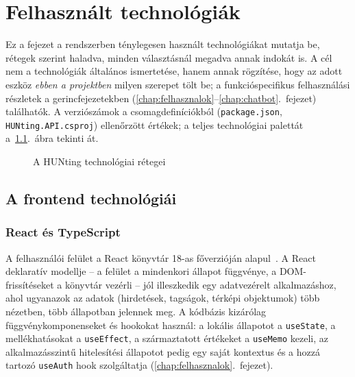
\chapter{Felhasznált technológiák}
\label{chap:technologiak}

Ez a fejezet a rendszerben ténylegesen használt technológiákat mutatja be, rétegek szerint
haladva, minden választásnál megadva annak indokát is. A cél nem a technológiák általános
ismertetése, hanem annak rögzítése, hogy az adott eszköz \emph{ebben a projektben} milyen
szerepet tölt be; a funkcióspecifikus felhasználási részletek a gerincfejezetekben
(\ref{chap:felhasznalok}--\ref{chap:chatbot}.~fejezet) találhatók. A verziószámok a
csomagdefiníciókból (\texttt{package.json}, \texttt{HUNting.API.csproj}) ellenőrzött értékek;
a teljes technológiai palettát a~\ref{fig:stack}.~ábra tekinti át.

\begin{figure}[htbp]
	\centering
	\caption{A HUNting technológiai rétegei}
	\label{fig:stack}
\end{figure}

\section{A frontend technológiái}
\label{sec:tech-frontend}

\subsection{React és TypeScript}

A felhasználói felület a React könyvtár 18-as főverzióján alapul~\cite{reactdocs}. A React
deklaratív modellje -- a felület a mindenkori állapot függvénye, a DOM-frissítéseket a könyvtár
vezérli -- jól illeszkedik egy adatvezérelt alkalmazáshoz, ahol ugyanazok az adatok (hirdetések,
tagságok, térképi objektumok) több nézetben, több állapotban jelennek meg. A kódbázis kizárólag
függvénykomponenseket és hookokat használ: a lokális állapotot a \texttt{useState}, a
mellékhatásokat a \texttt{useEffect}, a származtatott értékeket a \texttt{useMemo} kezeli, az
alkalmazásszintű hitelesítési állapotot pedig egy saját kontextus és a hozzá tartozó
\texttt{useAuth} hook szolgáltatja (\ref{chap:felhasznalok}.~fejezet).

